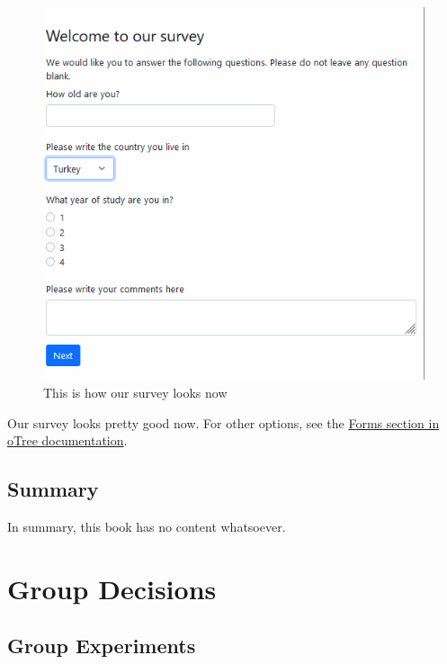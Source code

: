 \documentclass[
  letterpaper,
  DIV=11,
  numbers=noendperiod]{scrreprt}
\begin{document}
\begin{figure}

{\centering \includegraphics{part_otree/survey_formatted.png}

}

\caption{This is how our survey looks now}

\end{figure}

Our survey looks pretty good now. For other options, see the
\href{https://otree.readthedocs.io/en/latest/forms.html\#forms}{Forms
section in oTree documentation}.

\hypertarget{summary}{%
\chapter{Summary}\label{summary}}

In summary, this book has no content whatsoever.

\part{Group Decisions}

\hypertarget{group-experiments}{%
\chapter{Group Experiments}\label{group-experiments}}
\end{document}
